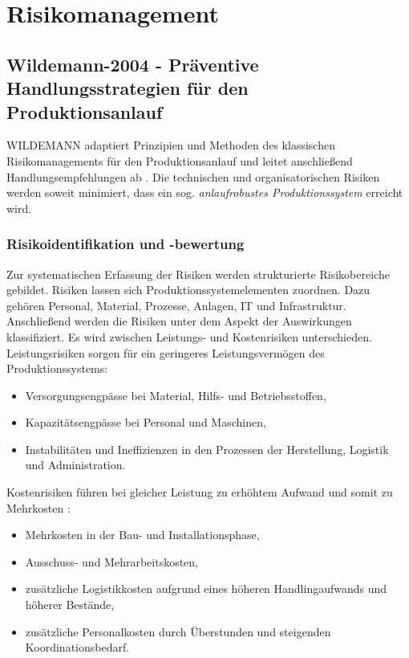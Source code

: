 \section{Risikomanagement}

\subsection*{Wildemann-2004 - Präventive Handlungsstrategien für den Produktionsanlauf}

WILDEMANN adaptiert Prinzipien und Methoden des klassischen Risikomanagements für den Produktionsanlauf und leitet anschließend Handlungsempfehlungen ab \autocite{Wildemann2004}. Die technischen und organisatorischen Risiken werden soweit minimiert, dass ein sog. \textit{anlaufrobustes Produktionssystem} erreicht wird. 


\subsubsection*{Risikoidentifikation und -bewertung}
Zur systematischen Erfassung der Risiken werden strukturierte Risikobereiche gebildet. 
Risiken lassen sich Produktionssystemelementen zuordnen. Dazu gehören Personal, Material, Prozesse, Anlagen, IT und Infrastruktur. Anschließend werden die Risiken unter dem Aspekt der Auswirkungen klassifiziert. Es wird zwischen Leistungs- und Kostenrisiken unterschieden. Leistungsrisiken sorgen für ein geringeres Leistungsvermögen des Produktionssystems:
\begin{itemize}
 \item Versorgungsengpässe bei Material,
Hilfs- und Betriebsstoffen,
\item Kapazitätsengpässe bei Personal und
Maschinen,
\item Instabilitäten und Ineffizienzen in
den Prozessen der Herstellung,
Logistik und Administration.
\end{itemize}
Kostenrisiken führen bei gleicher Leistung zu erhöhtem Aufwand und somit zu Mehrkosten \autocite{Wiendahl2002}: 
\begin{itemize}
 \item Mehrkosten in der Bau- und Installationsphase,
\item Ausschuss- und Mehrarbeitskosten,
\item zusätzliche Logistikkosten aufgrund
eines höheren Handlingaufwands
und höherer Bestände,
\item zusätzliche Personalkosten durch
Überstunden und steigenden Koordinationsbedarf.
\end{itemize}

